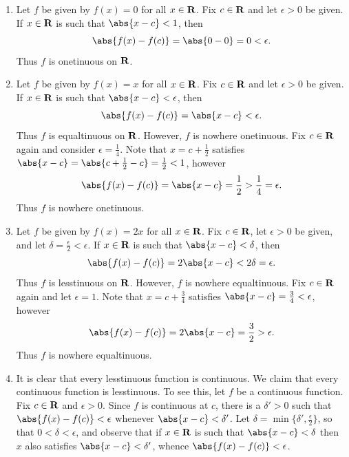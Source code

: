 \documentclass{lew98_solutions}
\begin{document}
\begin{solution}
    \begin{enumerate}
        \item Let \( f \) be given by \( f(x) = 0 \) for all \( x \in \mathbf{R} \). Fix \( c \in \mathbf{R} \) and let \( \epsilon > 0 \) be given. If \( x \in \mathbf{R} \) is such that \( \abs{x - c} < 1 \), then
        \[
            \abs{f(x) - f(c)} = \abs{0 - 0} = 0 < \epsilon.
        \]
        Thus \( f \) is onetinuous on \( \mathbf{R} \).

        \item Let \( f \) be given by \( f(x) = x \) for all \( x \in \mathbf{R} \). Fix \( c \in \mathbf{R} \) and let \( \epsilon > 0 \) be given. If \( x \in \mathbf{R} \) is such that \( \abs{x - c} < \epsilon \), then
        \[
            \abs{f(x) - f(c)} = \abs{x - c} < \epsilon.
        \]
        Thus \( f \) is equaltinuous on \( \mathbf{R} \). However, \( f \) is nowhere onetinuous. Fix \( c \in \mathbf{R} \) again and consider \( \epsilon = \tfrac{1}{4} \). Note that \( x = c + \tfrac{1}{2} \) satisfies \( \abs{x - c} = \abs{c + \tfrac{1}{2} - c} = \tfrac{1}{2} < 1 \), however
        \[
            \abs{f(x) - f(c)} = \abs{x - c} = \frac{1}{2} > \frac{1}{4} = \epsilon.
        \]
        Thus \( f \) is nowhere onetinuous.

        \item Let \( f \) be given by \( f(x) = 2x \) for all \( x \in \mathbf{R} \). Fix \( c \in \mathbf{R} \), let \( \epsilon > 0 \) be given, and let \( \delta = \tfrac{\epsilon}{2} < \epsilon \). If \( x \in \mathbf{R} \) is such that \( \abs{x - c} < \delta \), then
        \[
            \abs{f(x) - f(c)} = 2 \abs{x - c} < 2 \delta = \epsilon.
        \]
        Thus \( f \) is lesstinuous on \( \mathbf{R} \). However, \( f \) is nowhere equaltinuous. Fix \( c \in \mathbf{R} \) again and let \( \epsilon = 1 \). Note that \( x = c + \tfrac{3}{4} \) satisfies \( \abs{x - c} = \tfrac{3}{4} < \epsilon \), however
        \[
            \abs{f(x) - f(c)} = 2 \abs{x - c} = \frac{3}{2} > \epsilon.
        \]
        Thus \( f \) is nowhere equaltinuous.

        \item It is clear that every lesstinuous function is continuous. We claim that every continuous function is lesstinuous. To see this, let \( f \) be a continuous function. Fix \( c \in \mathbf{R} \) and \( \epsilon > 0 \). Since \( f \) is continuous at \( c \), there is a \( \delta' > 0 \) such that \( \abs{f(x) - f(c)} < \epsilon \) whenever \( \abs{x - c} < \delta' \). Let \( \delta = \min \{ \delta', \tfrac{\epsilon}{2} \} \), so that \( 0 < \delta < \epsilon \), and observe that if \( x \in \mathbf{R} \) is such that \( \abs{x - c} < \delta \) then \( x \) also satisfies \( \abs{x - c} < \delta' \), whence \( \abs{f(x) - f(c)} < \epsilon \).
    \end{enumerate}
\end{solution}
\end{document}
